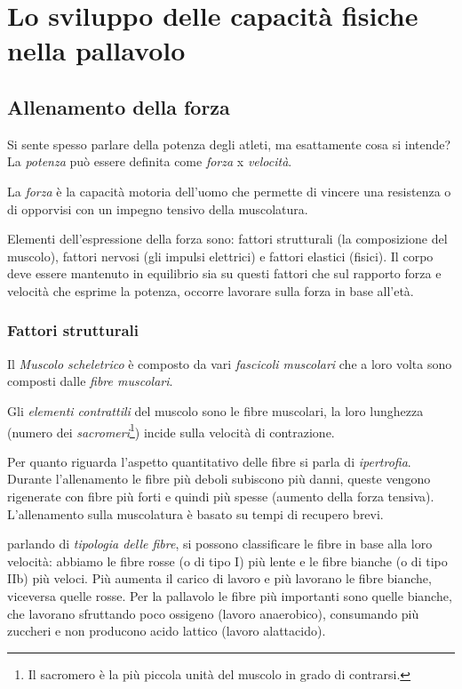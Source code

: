 \chapter{Lo sviluppo delle capacità fisiche nella pallavolo}

\section{Allenamento della forza}
Si sente spesso parlare della potenza degli atleti, ma esattamente cosa si
intende? La \emph{potenza} può essere definita come \emph{forza} x
\emph{velocità}.

\begin{defi}
La \emph{forza} è la capacità motoria dell'uomo che permette di vincere una resistenza o di opporvisi con un impegno tensivo della muscolatura.
\end{defi}

Elementi dell'espressione della forza sono: fattori strutturali (la composizione
del muscolo), fattori nervosi (gli impulsi elettrici) e fattori elastici (fisici).
Il corpo deve essere mantenuto in equilibrio sia su questi fattori che sul
rapporto forza e velocità che esprime la potenza, occorre lavorare sulla forza
in base all'età.

\subsection{Fattori strutturali}
Il \emph{Muscolo scheletrico} è composto da vari \emph{fascicoli muscolari}
che a loro volta sono composti dalle \emph{fibre muscolari}.

Gli \emph{elementi contrattili} del muscolo sono le fibre muscolari, la loro
lunghezza (numero dei \emph{sacromeri}\footnote{Il sacromero è la più piccola
unità del muscolo in grado di contrarsi.}) incide sulla velocità di contrazione.

Per quanto riguarda l'aspetto quantitativo delle fibre si parla di
\emph{ipertrofia}. Durante l'allenamento le fibre più deboli subiscono più
danni, queste vengono rigenerate con fibre più forti e quindi più spesse
(aumento della forza tensiva). L'allenamento sulla muscolatura è basato su
tempi di recupero brevi.

parlando di \emph{tipologia delle fibre}, si possono classificare le fibre
in base alla
loro velocità: abbiamo le fibre rosse (o di tipo I) più lente e le fibre bianche
(o di tipo IIb) più veloci. Più aumenta il carico di lavoro e più lavorano le
fibre bianche, viceversa quelle rosse. Per la pallavolo le fibre più importanti
sono quelle bianche, che lavorano sfruttando poco ossigeno (lavoro anaerobico), consumando più zuccheri e non producono acido lattico (lavoro alattacido). 

